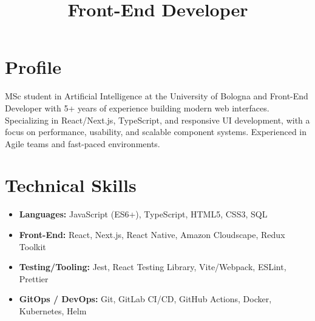 \documentclass[11pt,a4paper,sans]{moderncv}
\title{Front-End Developer} %
\begin{document}
\makecvtitle

\vspace {-2em}

\section{Profile}
\vspace{-1mm}
MSc student in Artificial Intelligence at the University of Bologna and Front-End Developer with 5+ years of experience building modern web interfaces. Specializing in React/Next.js, TypeScript, and responsive UI development, with a focus on performance, usability, and scalable component systems. Experienced in Agile teams and fast-paced environments.

    
    


\section{Technical Skills}
\begin{itemize}
    \item \textbf{Languages:} JavaScript (ES6+), TypeScript, HTML5, CSS3, SQL
    \item \textbf{Front-End:} React, Next.js, React Native, Amazon Cloudscape, Redux Toolkit
    \item \textbf{Testing/Tooling:} Jest, React Testing Library, Vite/Webpack, ESLint, Prettier
    \item \textbf{GitOps / DevOps:} Git, GitLab CI/CD, GitHub Actions, Docker, Kubernetes, Helm
\end{itemize}
\end{document}
